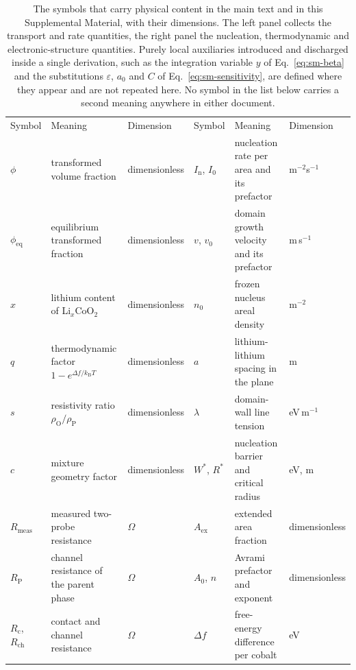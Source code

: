 \documentclass[reprint,twocolumn,prb,amsmath,amssymb,superscriptaddress,floatfix]{revtex4-2}
\newcommand{\kB}{k_{\mathrm{B}}}
\begin{document}
\begin{table}[t]
  \caption{The symbols that carry physical content in the main text and in this Supplemental
  Material, with their dimensions. The left panel collects the transport and rate quantities,
  the right panel the nucleation, thermodynamic and electronic-structure quantities. Purely
  local auxiliaries introduced and discharged inside a single derivation, such as the
  integration variable $y$ of Eq.~\eqref{eq:sm-beta} and the substitutions $\varepsilon$,
  $a_{0}$ and $C$ of Eq.~\eqref{eq:sm-sensitivity}, are defined where they appear and are not
  repeated here. No symbol in the list below carries a second meaning anywhere in either
  document.}
  \label{tab:symbols}
  \renewcommand{\arraystretch}{1.10}
  \footnotesize
  \begin{ruledtabular}
  \begin{tabular}{lll@{\qquad}lll}
    Symbol & Meaning & Dimension & Symbol & Meaning & Dimension \\
    \colrule
    $\phi$ & transformed volume fraction & dimensionless & $I_{\mathrm{n}}$, $I_{0}$ & nucleation rate per area and its prefactor & m$^{-2}$s$^{-1}$ \\
    $\phi_{\mathrm{eq}}$ & equilibrium transformed fraction & dimensionless & $v$, $v_{0}$ & domain growth velocity and its prefactor & m\,s$^{-1}$ \\
    $x$ & lithium content of Li$_{x}$CoO$_{2}$ & dimensionless & $n_{0}$ & frozen nucleus areal density & m$^{-2}$ \\
    $q$ & thermodynamic factor $1-e^{\Delta f/\kB T}$ & dimensionless & $a$ & lithium-lithium spacing in the plane & m \\
    $s$ & resistivity ratio $\rho_{\mathrm{O}}/\rho_{\mathrm{P}}$ & dimensionless & $\lambda$ & domain-wall line tension & eV\,m$^{-1}$ \\
    $c$ & mixture geometry factor & dimensionless & $W^{*}$, $R^{*}$ & nucleation barrier and critical radius & eV, m \\
    $R_{\mathrm{meas}}$ & measured two-probe resistance & $\Omega$ & $A_{\mathrm{ex}}$ & extended area fraction & dimensionless \\
    $R_{\mathrm{P}}$ & channel resistance of the parent phase & $\Omega$ & $A_{0}$, $n$ & Avrami prefactor and exponent & dimensionless \\
    $R_{\mathrm{c}}$, $R_{\mathrm{ch}}$ & contact and channel resistance & $\Omega$ & $\Delta f$ & free-energy difference per cobalt & eV \\

\end{tabular}
\end{ruledtabular}
\end{table}
\end{document}
